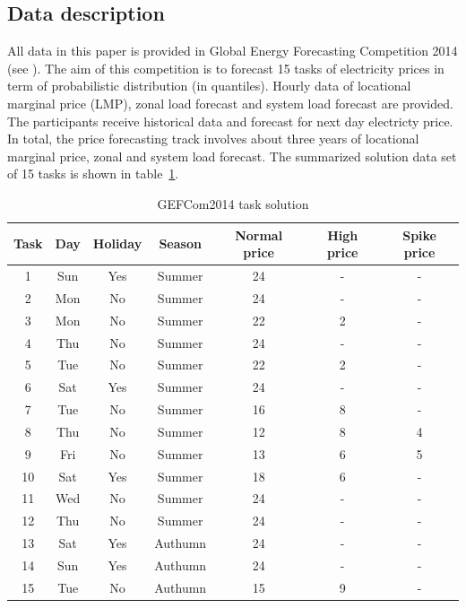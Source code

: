 \documentclass[review]{elsarticle}
\begin{document}
    \subsection{Data description}
      All data in this paper is provided in Global Energy Forecasting Competition 2014 (see \cite{Hong2016}). The aim of this competition is to forecast 15 tasks of electricity prices in term of probabilistic distribution (in quantiles). Hourly data of locational marginal price (LMP), zonal load forecast and system load forecast are provided. The participants receive historical data and forecast for next day electricty price. In total, the price forecasting track involves about three years of locational marginal price, zonal and system load forecast. The summarized solution data set of 15 tasks is shown in table~\ref{table:price_data_set}.
      \begin{table}[H]
        \begin{center}
        \caption{GEFCom2014 task solution}
        \begin{adjustbox}{width=\textwidth}
          \begin{tabular}{|c|c|c|c|c|c|c|}
            \hline
            Task & Day & Holiday & Season & Normal price & High price & Spike price\\
            \hline
            1 & Sun & Yes & Summer & 24 & - & -\\
            2 & Mon & No & Summer & 24 & - & -\\
            3 & Mon & No & Summer & 22 & 2 & -\\
            4 & Thu & No & Summer & 24 & - & -\\
            5 & Tue & No & Summer & 22 & 2 & -\\
            6 & Sat & Yes & Summer & 24 & - & -\\
            7 & Tue & No & Summer & 16 & 8 & -\\
            8 & Thu & No & Summer & 12 & 8 & 4\\
            9 & Fri & No & Summer & 13 & 6 & 5\\
            10 & Sat & Yes & Summer & 18 & 6 & -\\
            11 & Wed & No & Summer & 24 & - & -\\
            12 & Thu & No & Summer & 24 & - & -\\
            13 & Sat & Yes & Authumn & 24 & - & -\\
            14 & Sun & Yes & Authumn & 24 & - & -\\
            15 & Tue & No & Authumn & 15 & 9 & -\\
            \hline
          \end{tabular}
        \end{adjustbox}
        \label{table:price_data_set}
        \end{center}
      \end{table}
\end{document}
